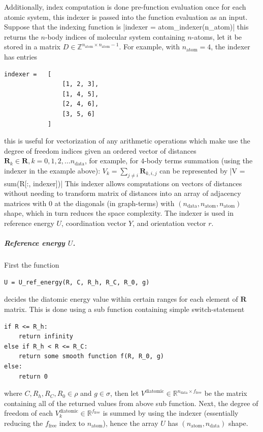 \documentclass[12pt]{article}
\begin{document}
Additionally, index computation is done pre-function evaluation once for each atomic system, this indexer is passed into the function evaluation as an input. Suppose that the indexing function is
|indexer = atom_indexer(n_atom)|
\noindent this returns the $n$-body indices of molecular system containing $n$-atoms, let it be stored in a matrix $D \in \mathbb{Z}^{n_\text{atom} \times n_\text{atom} - 1}$. For example, with $n_\text{atom} = 4$, the indexer has entries
\begin{verbatim}
indexer =   [
                [1, 2, 3],
                [1, 4, 5],
                [2, 4, 6],
                [3, 5, 6]
            ]
\end{verbatim}
\noindent this is useful for vectorization of any arithmetic operations which make use the degree of freedom indices given an ordered vector of distances $\textbf{R}_k \in \textbf{R}, k=0,1,2,...n_\text{data}$, for example, for $4$-body terms summation (using the indexer in the example above): $V_k = \sum_{j \neq i} \textbf{R}_{k,i,j}$ can be represented by
|V = sum(R[:, indexer])|
\noindent This indexer allows computations on vectors of distances without needing to transform matrix of distances into an array of adjacency matrices with 0 at the diagonals (in graph-terms) with $(n_\text{data}, n_\text{atom}, n_\text{atom})$ shape, which in turn reduces the space complexity. The indexer is used in reference energy $U$, coordination vector $Y$, and orientation vector $r$.

\subparagraph{Reference energy $U$.}
First the function
\begin{verbatim}
U = U_ref_energy(R, C, R_h, R_C, R_0, g)
\end{verbatim}
decides the diatomic energy value within certain ranges for each element of  $\textbf{R}$ matrix. This is done using a sub function containing simple switch-statement
\begin{verbatim}
if R <= R_h:
    return infinity
else if R_h < R <= R_C:
    return some smooth function f(R, R_0, g)
else:
    return 0
\end{verbatim}
\noindent where $C, R_h, R_C, R_0 \in \rho$ and $g \in \sigma$, then let $V^\text{diatomic} \in \mathbb{R}^{n_\text{data} \times f_\text{free}}$ be the matrix containing all of the returned values from above sub function. Next, the degree of freedom of each $V^\text{diatomic}_k \in \mathbb{R}^{f_\text{free}}$ is summed by using the indexer (essentially reducing the $f_\text{free}$ index to $n_\text{atom}$), hence the array $U$ has $(n_\text{atom}, n_\text{data})$ shape.
\end{document}
